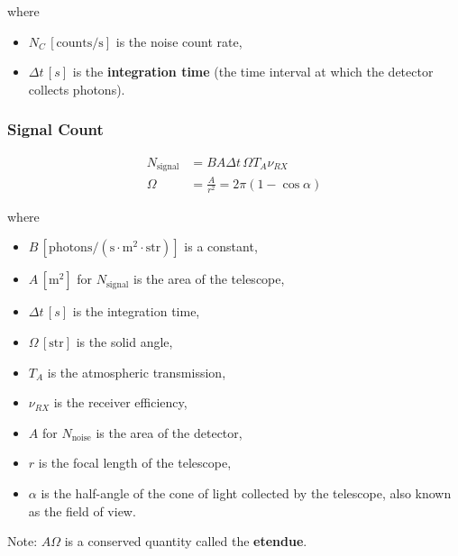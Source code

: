 where

\begin{itemize}
    \item $N_C \, [\text{counts/s}]$ is the noise count rate,
    \item $\Delta t \, [s]$ is the \textbf{integration time} (the time interval at which the detector collects photons).
\end{itemize}

\subsubsection{Signal Count}

\begin{align*}
    N_{\text{signal}} & = BA\Delta t \, \Omega T_A \nu_{RX}  \\
    \Omega            & = \frac{A}{r^2} = 2\pi(1-\cos\alpha)
\end{align*}

where

\begin{itemize}
    \item $B \, [\text{photons}/(\text{s} \cdot \text{m}^2 \cdot \text{str})]$ is a constant,
    \item $A \, [\text{m}^2]$ for $N_{\text{signal}}$ is the area of the telescope,
    \item $\Delta t \, [s]$ is the integration time,
    \item $\Omega \, [\text{str}]$ is the solid angle,
    \item $T_A$ is the atmospheric transmission,
    \item $\nu_{RX}$ is the receiver efficiency,
    \item $A$ for $N_{\text{noise}}$ is the area of the detector,
    \item $r$ is the focal length of the telescope,
    \item $\alpha$ is the half-angle of the cone of light collected by the telescope, also known as the field of view.
\end{itemize}

Note: $A\Omega$ is a conserved quantity called the \textbf{etendue}.